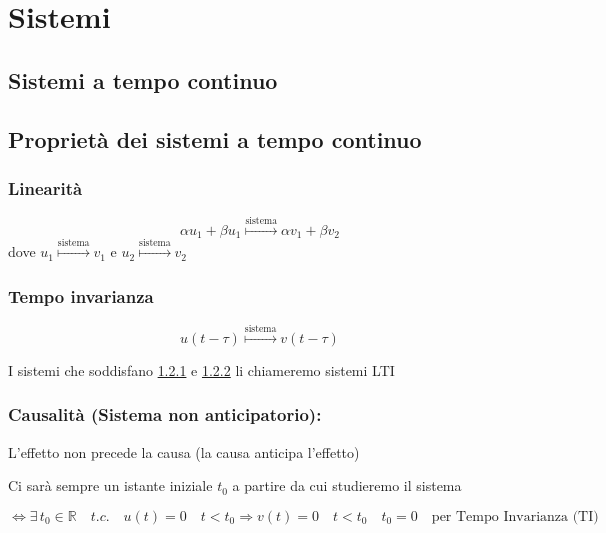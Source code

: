\chapter{Sistemi}
\section{Sistemi a tempo continuo}


\section{Proprietà dei sistemi a tempo continuo}
\subsection{Linearità}\label{sist_prop_Lin}  
	\[
	\alpha u_1+\beta u_1 \overset{\text{sistema}}{\longmapsto} \alpha v_1+\beta v_2
	\]
	dove $ u_1 \overset{\text{sistema}}{\longmapsto} v_1$ e $u_2\overset{\text{sistema}}{\longmapsto} v_2$
	
\subsection{Tempo invarianza} \label{sist_prop_TIn}
	\[
	u(t-\tau) \overset{\text{sistema}}{\longmapsto} v(t-\tau)
	\]
	
	\begin{definizione}
		I sistemi che soddisfano \ref{sist_prop_Lin} e \ref{sist_prop_TIn} li chiameremo sistemi LTI
	\end{definizione}

 \subsection{Causalità (Sistema non anticipatorio):} \label{sist_prop_cau}
	
	L'effetto non precede la causa (la causa anticipa l'effetto)
	
	\begin{osservazione}
		Ci sarà sempre un istante iniziale $t_0$ a partire da cui studieremo il sistema
	\end{osservazione}
		\[
		\Leftrightarrow \exists \,t_0 \in \mathbb{R} \quad t.c. \quad u(t)=0 \quad t<t_0
		\Rightarrow v(t)=0 \quad t<t_0
		\quad t_0 =0 \quad \text{per Tempo Invarianza (TI)}
	\]
